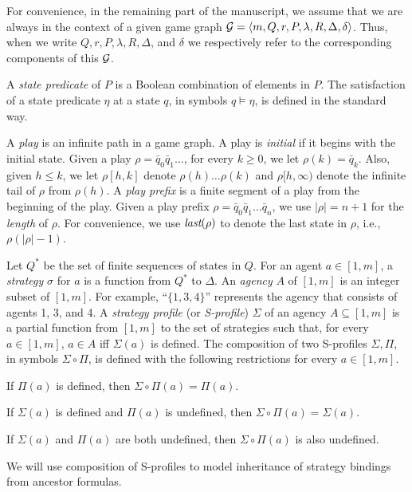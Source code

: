 For convenience, in the remaining part of the manuscript, we assume that we are always in the context of a given game graph ${\cal G}=\langle m,Q,r,P,\lambda,R,\Delta,\delta\rangle$.
Thus, when we write $Q,r,P,\lambda,R,\Delta$, and $\delta$ we respectively refer to the corresponding components of this ${\cal G}$.  

A {\em state predicate} of $P$ is a Boolean combination of elements in $P$.
The satisfaction of a state predicate $\eta$ at a state $q$,
in symbols $q\models \eta$, is defined in the standard way.

A {\em play} is an infinite path in a game graph.
A play is {\em initial} if it begins with the initial state.
Given a play $\rho=\bar{q}_0\bar{q}_1\ldots$,
for every $k\geq 0$, we let $\rho(k)=\bar{q}_k$.
Also, given $h\leq k$,
we let $\rho[h,k]$ denote $\rho(h)\ldots\rho(k)$ and
$\rho[h,\infty)$ denote the infinite tail of $\rho$
from $\rho(h)$.
A {\em play prefix} is a finite segment of a play from the beginning of
the play.
Given a play prefix $\rho=\bar{q}_0\bar{q}_1\ldots \bar{q}_n$, 
we use $|\rho|=n+1$ for the {\em length} of $\rho$.
For convenience, we use $\textit{last}(\rho)$ to denote the 
last state in $\rho$, i.e., $\rho(|\rho|-1)$.  

Let $Q^*$ be the set of finite sequences of states in $Q$.  
For an agent $a\in [1,m]$,
a {\em strategy} $\sigma$ for $a$ is
a function from $Q^*$ to $\Delta$.
An {\em agency} $A$ of $[1,m]$ is an integer subset of $[1,m]$.  
For example, ``$\{1,3,4\}$'' represents the agency that consists of agents 1, 3, and 4. 
A {\em strategy profile} (or {\em S-profile}) $\Sigma$ of 
an agency $A\subseteq [1,m]$ 
is a partial function from $[1,m]$ to the set of strategies
such that, for every $a\in[1,m]$, 
$a\in A$ iff %
$\Sigma(a)$ is defined.  
The composition of two S-profiles $\Sigma,\Pi$,
in symbols $\Sigma\circ\Pi$, is defined with
the following restrictions for every $a\in[1,m]$.
\begin{list1}
\item If $\Pi(a)$ is defined,
    then $\Sigma\circ\Pi(a)=\Pi(a)$.
\item If $\Sigma(a)$ is defined and $\Pi(a)$ is undefined,
    then $\Sigma\circ\Pi(a)=\Sigma(a)$.
\item If $\Sigma(a)$ and $\Pi(a)$ are both undefined,
    then $\Sigma\circ\Pi(a)$ is also undefined.
\end{list1} 
We will use composition of S-profiles to model 
inheritance of strategy bindings from ancestor formulas. 

